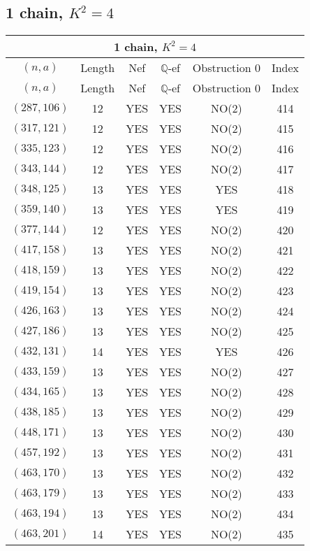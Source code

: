 \subsection{1 chain, $K^2 = 4$}
\begin{longtable}{|c|c|c|c|c|c|}
\hline
\multicolumn{6}{|c|}{1 chain, $K^2 = 4$}\\
\hline
$(n,a)$ & Length & Nef & $\mathbb Q$-ef & Obstruction 0 & Index\\
\hline
\endfirsthead

\hline
$(n,a)$ & Length & Nef & $\mathbb Q$-ef & Obstruction 0 & Index\\
\hline
\endhead
\hline
\endfoot

$(287, 106)$ & 12 & YES & YES & NO(2) & 414\\
$(317, 121)$ & 12 & YES & YES & NO(2) & 415\\
$(335, 123)$ & 12 & YES & YES & NO(2) & 416\\
$(343, 144)$ & 12 & YES & YES & NO(2) & 417\\
$(348, 125)$ & 13 & YES & YES & YES & 418\\
$(359, 140)$ & 13 & YES & YES & YES & 419\\
$(377, 144)$ & 12 & YES & YES & NO(2) & 420\\
$(417, 158)$ & 13 & YES & YES & NO(2) & 421\\
$(418, 159)$ & 13 & YES & YES & NO(2) & 422\\
$(419, 154)$ & 13 & YES & YES & NO(2) & 423\\
$(426, 163)$ & 13 & YES & YES & NO(2) & 424\\
$(427, 186)$ & 13 & YES & YES & NO(2) & 425\\
$(432, 131)$ & 14 & YES & YES & YES & 426\\
$(433, 159)$ & 13 & YES & YES & NO(2) & 427\\
$(434, 165)$ & 13 & YES & YES & NO(2) & 428\\
$(438, 185)$ & 13 & YES & YES & NO(2) & 429\\
$(448, 171)$ & 13 & YES & YES & NO(2) & 430\\
$(457, 192)$ & 13 & YES & YES & NO(2) & 431\\
$(463, 170)$ & 13 & YES & YES & NO(2) & 432\\
$(463, 179)$ & 13 & YES & YES & NO(2) & 433\\
$(463, 194)$ & 13 & YES & YES & NO(2) & 434\\
$(463, 201)$ & 14 & YES & YES & NO(2) & 435\\

\end{longtable}
